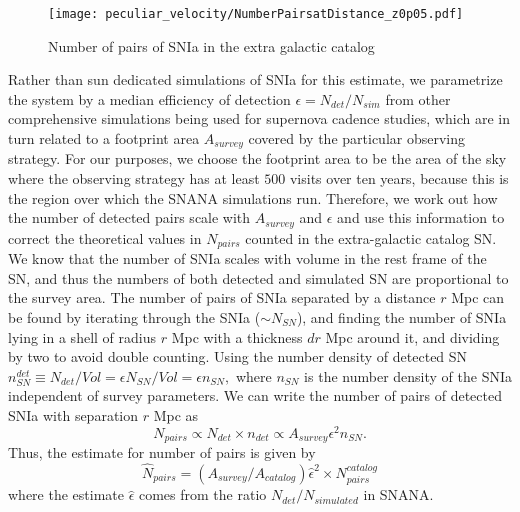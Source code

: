 \begin{figure}
    \begin{center}
        {\texttt{[image: peculiar\_velocity/NumberPairsatDistance\_z0p05.pdf]}}
        \caption{Number of pairs of SNIa in the extra galactic catalog }
         \label{fig:num_pairs_cat}
    \end{center}
\end{figure}


Rather than sun dedicated simulations of SNIa for this estimate, we parametrize the system by a median efficiency of detection $\epsilon = N_{det}/N_{sim}$ from other comprehensive simulations being used for supernova cadence studies, which are in turn related to a footprint area $A_{survey}$ covered by the particular observing strategy. For our purposes, we choose the footprint area to be the area of the sky where the observing strategy has at least $500$ visits over ten years, because this is the region over which the SNANA simulations run.
Therefore, we work out how the number of detected pairs scale with $A_{survey}$ and $\epsilon$ and use this information to correct the theoretical values in $N_{pairs}$ counted in the extra-galactic catalog SN. We know that the number of SNIa scales with volume in the rest frame of the SN, and thus the numbers of both detected and simulated SN are proportional to the survey area. The number of pairs of SNIa separated by a distance $r$ Mpc can be found by iterating through the SNIa ($\sim N_{SN}$), and finding the number of SNIa lying in a shell of radius $r$ Mpc with a thickness $dr$ Mpc around it, and dividing by two to avoid double counting. Using the number density of detected SN $n^{det}_{SN} \equiv N_{det}/Vol = \epsilon N_{SN}/Vol = \epsilon n_{SN},$ where $n_{SN}$ is the number density of the SNIa independent of survey parameters. We can write the number of pairs of detected SNIa with separation $r$ Mpc as 
    $$
    N_{pairs} \propto N_{det} \times {n_{det}} \propto A_{survey} \epsilon^2 {n_{SN}}.
    $$
Thus, the estimate for number of pairs is given by
$$
    \hat{N}_{pairs} = \left( A_{survey} / A_{catalog} \right)\hat{\epsilon}^2 \times N_{pairs}^{catalog}
    $$
where the estimate $\hat{\epsilon}$ comes from the ratio $N_{det}/ N_{simulated}$ in SNANA. 

